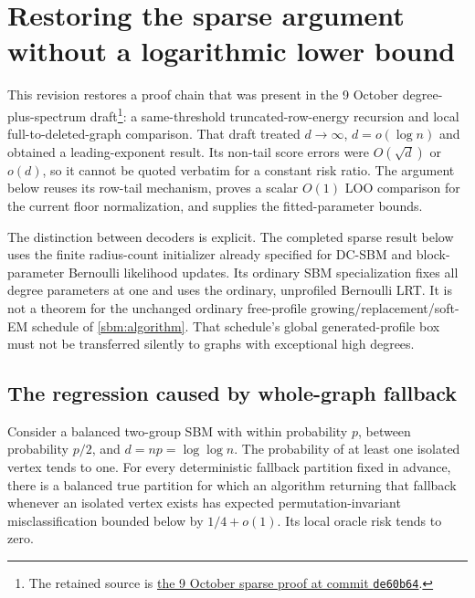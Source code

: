 \section{Restoring the sparse argument without a logarithmic lower bound}
\label{sec:sparse-restored}

This revision restores a proof chain that was present in the 9 October
degree-plus-spectrum draft\footnote{The retained source is
\href{https://github.com/zhixin0825/spectral-lrt/blob/de60b64c7d7f127ae6dc1d010c840af707a080da/paper/previous_draft/sbm_spectral_lrt_20261009.tex}{the 9 October sparse proof at commit \texttt{de60b64}}.}:
a same-threshold truncated-row-energy
recursion and local full-to-deleted-graph comparison. That draft treated
$d\to\infty$, $d=o(\log n)$ and obtained a leading-exponent result.
Its non-tail score errors were $O(\sqrt d)$ or $o(d)$, so it cannot be
quoted verbatim for a constant risk ratio. The argument below reuses its
row-tail mechanism, proves a scalar $O(1)$ LOO comparison for the current
floor normalization, and supplies the fitted-parameter bounds.

The distinction between decoders is explicit. The completed sparse
result below uses the finite radius-count initializer already specified
for DC-SBM and block-parameter Bernoulli likelihood updates. Its ordinary
SBM specialization fixes all degree parameters at one and uses the
ordinary, unprofiled Bernoulli LRT. It is not a theorem for the unchanged
ordinary free-profile growing/replacement/soft-EM schedule of
\cref{sbm:algorithm}. That schedule's global generated-profile box must
not be transferred silently to graphs with exceptional high degrees.

\subsection{The regression caused by whole-graph fallback}

\begin{proposition}\label{restore:fallback}
Consider a balanced two-group SBM with within probability $p$, between
probability $p/2$, and $d=np=\log\log n$. The probability of at least
one isolated vertex tends to one. For every deterministic fallback
partition fixed in advance, there is a balanced true partition for which
an algorithm returning that fallback whenever an isolated vertex exists
has expected permutation-invariant misclassification bounded below by
$1/4+o(1)$. Its local oracle risk tends to zero.
\end{proposition}

